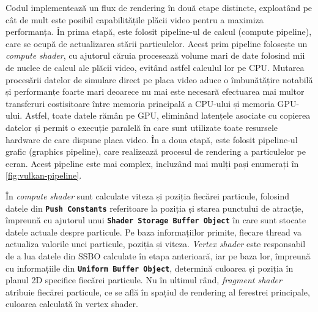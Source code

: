 Codul implementează un flux de rendering în două etape distincte, exploatând pe cât de mult este posibil capabilitățile plăcii video pentru a maximiza performanța. În prima etapă, este folosit pipeline-ul de calcul (compute pipeline), care se ocupă de actualizarea stării particulelor. Acest prim pipeline folosește un \textit{compute shader}, cu ajutorul căruia procesează volume mari de date folosind mii de nuclee de calcul ale plăcii video, evitând astfel calculul lor pe CPU. Mutarea procesării datelor de simulare direct pe placa video aduce o îmbunătățire notabilă și performanțe foarte mari deoarece nu mai este necesară efectuarea mai multor transferuri costisitoare între memoria principală a CPU-ului și memoria GPU-ului. Astfel, toate datele rămân pe GPU, eliminând latențele asociate cu copierea datelor și permit o execuție paralelă în care sunt utilizate toate resursele hardware de care dispune placa video. În a doua etapă, este folosit pipeline-ul grafic (graphics pipeline), care realizează procesul de rendering a particulelor pe ecran. Acest pipeline este mai complex, incluzând mai mulți pași enumerați în \autoref{fig:vulkan-pipeline}. 

În \textit{compute shader} sunt calculate viteza și poziția fiecărei particule, folosind datele din \textbf{\texttt{Push Constants}} referitoare la poziția și starea punctului de atracție, împreună cu ajutorul unui \textbf{\texttt{Shader Storage Buffer Object}} în care sunt stocate datele actuale despre particule. Pe baza informațiilor primite, fiecare thread va actualiza valorile unei particule, poziția și viteza. \textit{Vertex shader} este responsabil de a lua datele din SSBO calculate în etapa anterioară, iar pe baza lor, împreună cu informațiile din \textbf{\texttt{Uniform Buffer Object}}, determină culoarea și poziția în planul 2D specifice fiecărei particule. Nu în ultimul rând, \textit{fragment shader} atribuie fiecărei particule, ce se află în spațiul de rendering al ferestrei principale, culoarea calculată în vertex shader. 





